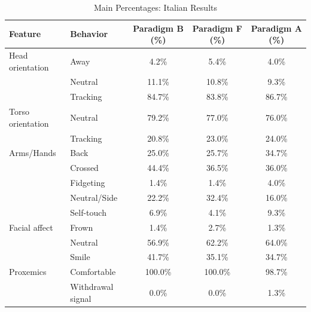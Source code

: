 \begin{table}[ht]
\centering
\caption{Main Percentages: Italian Results}
\label{tab:main_pct_italian}
\begin{tabular}{llccc}
\toprule
Feature & Behavior & Paradigm B (\%) & Paradigm F (\%) & Paradigm A (\%) \\
\midrule
Head orientation & Away & 4.2\% & 5.4\% & 4.0\% \\
~ & Neutral & 11.1\% & 10.8\% & 9.3\% \\
~ & Tracking & 84.7\% & 83.8\% & 86.7\% \\
\midrule
Torso orientation & Neutral & 79.2\% & 77.0\% & 76.0\% \\
~ & Tracking & 20.8\% & 23.0\% & 24.0\% \\
\midrule
Arms/Hands & Back & 25.0\% & 25.7\% & 34.7\% \\
~ & Crossed & 44.4\% & 36.5\% & 36.0\% \\
~ & Fidgeting & 1.4\% & 1.4\% & 4.0\% \\
~ & Neutral/Side & 22.2\% & 32.4\% & 16.0\% \\
~ & Self-touch & 6.9\% & 4.1\% & 9.3\% \\
\midrule
Facial affect & Frown & 1.4\% & 2.7\% & 1.3\% \\
~ & Neutral & 56.9\% & 62.2\% & 64.0\% \\
~ & Smile & 41.7\% & 35.1\% & 34.7\% \\
\midrule
Proxemics & Comfortable & 100.0\% & 100.0\% & 98.7\% \\
~ & Withdrawal signal & 0.0\% & 0.0\% & 1.3\% \\
\bottomrule
\end{tabular}
\end{table}